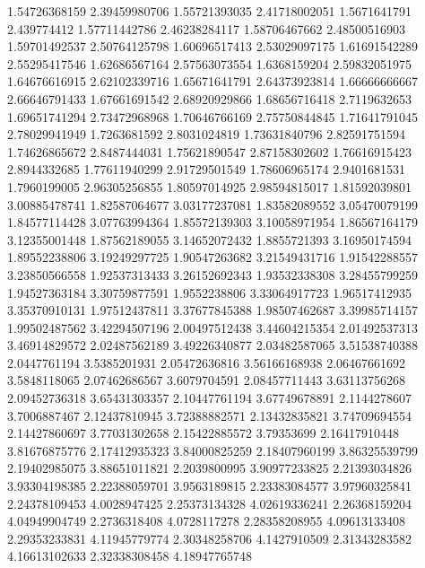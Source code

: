   1.54726368159    2.39459980706
  1.55721393035    2.41718002051
   1.5671641791      2.439774412
  1.57711442786    2.46238284117
  1.58706467662    2.48500516903
  1.59701492537    2.50764125798
  1.60696517413    2.53029097175
  1.61691542289    2.55295417546
  1.62686567164    2.57563073554
   1.6368159204    2.59832051975
  1.64676616915    2.62102339716
  1.65671641791    2.64373923814
  1.66666666667    2.66646791433
  1.67661691542    2.68920929866
  1.68656716418     2.7119632653
  1.69651741294    2.73472968968
  1.70646766169    2.75750844845
  1.71641791045    2.78029941949
   1.7263681592     2.8031024819
  1.73631840796    2.82591751594
  1.74626865672     2.8487444031
  1.75621890547    2.87158302602
  1.76616915423     2.8944332685
  1.77611940299    2.91729501549
  1.78606965174     2.9401681531
   1.7960199005    2.96305256855
  1.80597014925    2.98594815017
  1.81592039801    3.00885478741
  1.82587064677    3.03177237081
  1.83582089552    3.05470079199
  1.84577114428    3.07763994364
  1.85572139303    3.10058971954
  1.86567164179    3.12355001448
  1.87562189055    3.14652072432
   1.8855721393    3.16950174594
  1.89552238806    3.19249297725
  1.90547263682    3.21549431716
  1.91542288557    3.23850566558
  1.92537313433    3.26152692343
  1.93532338308    3.28455799259
  1.94527363184    3.30759877591
   1.9552238806    3.33064917723
  1.96517412935    3.35370910131
  1.97512437811    3.37677845388
  1.98507462687    3.39985714157
  1.99502487562    3.42294507196
  2.00497512438    3.44604215354
  2.01492537313    3.46914829572
  2.02487562189    3.49226340877
  2.03482587065    3.51538740388
   2.0447761194     3.5385201931
  2.05472636816    3.56166168938
  2.06467661692     3.5848118065
  2.07462686567     3.6079704591
  2.08457711443    3.63113756268
  2.09452736318    3.65431303357
  2.10447761194    3.67749678891
   2.1144278607     3.7006887467
  2.12437810945    3.72388882571
  2.13432835821    3.74709694554
  2.14427860697    3.77031302658
  2.15422885572       3.79353699
  2.16417910448    3.81676875776
  2.17412935323    3.84000825259
  2.18407960199    3.86325539799
  2.19402985075    3.88651011821
   2.2039800995    3.90977233825
  2.21393034826    3.93304198385
  2.22388059701     3.9563189815
  2.23383084577    3.97960325841
  2.24378109453     4.0028947425
  2.25373134328    4.02619336241
  2.26368159204    4.04949904749
   2.2736318408     4.0728117278
  2.28358208955    4.09613133408
  2.29353233831    4.11945779774
  2.30348258706     4.1427910509
  2.31343283582    4.16613102633
  2.32338308458    4.18947765748
